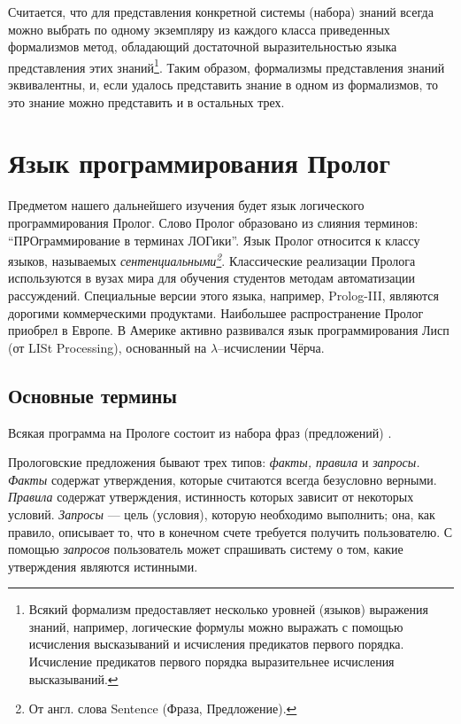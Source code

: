 \documentclass[12pt, openany, twoside]{book} %
\begin{document}
\medskip{} Считается, что для представления конкретной системы (набора) знаний всегда можно выбрать по одному экземпляру из каждого класса приведенных формализмов метод, обладающий достаточной выразительностью языка представления этих знаний\footnote{Всякий формализм предоставляет несколько уровней (языков) выражения знаний, например, логические формулы можно выражать с помощью исчисления высказываний и исчисления предикатов первого порядка. Исчисление предикатов первого порядка выразительнее исчисления высказываний.}. Таким образом, формализмы представления знаний эквивалентны, и, если удалось представить знание в одном из формализмов, то это знание можно представить и в остальных трех.

\chapter{Язык программирования Пролог}

Предметом нашего дальнейшего изучения будет язык логического программирования Пролог. Слово Пролог образовано из слияния терминов: ``ПРОграммирование в терминах ЛОГики''. Язык Пролог относится к классу языков, называемых {\em сентенциальными\footnote{От англ. слова Sentence (Фраза, Предложение).}}.  Классические реализации Пролога используются в вузах мира для обучения студентов методам автоматизации рассуждений. Специальные версии этого языка, например, Prolog-III, являются дорогими коммерческими продуктами. Наибольшее распространение Пролог приобрел в Европе. В Америке активно развивался язык программирования Лисп (от LISt Processing), основанный на $\lambda$--исчислении Чёрча. %

\section{Основные термины}

Всякая программа на Прологе состоит из набора фраз (предложений) \cite{Bratko}.

Прологовские предложения бывают трех типов: \emph{факты, правила} и \emph{запросы.} \emph{Факты} содержат утверждения, которые считаются всегда безусловно верными. \emph{Правила} содержат утверждения, истинность которых зависит от некоторых условий. \emph{Запросы} --- цель (условия), которую необходимо выполнить; она, как правило, описывает то, что в конечном счете требуется получить пользователю. С помощью \emph{запросов} пользователь может спрашивать систему о том, какие утверждения являются истинными.
\end{document}
